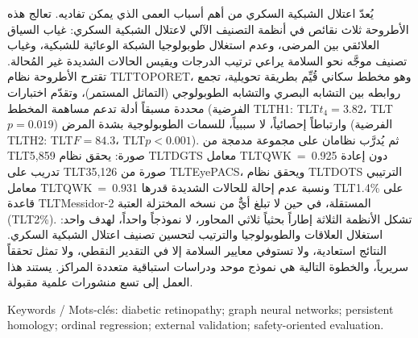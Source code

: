 \documentclass[11pt,a4paper]{article}
\newcommand{\en}[1]{\mbox{\textdir TLT\relax\foreignlanguage{english}{#1}}}
\newcommand{\sect}[1]{\par\vspace{5pt}{\color{navy}\bfseries\large #1}\par\vspace{1pt}{\color{navy}\hrule height 0.6pt}\vspace{4pt}}
\begin{document}
\sect{\foreignlanguage{arabic}{ملخص}}
\begin{otherlanguage}{arabic}
يُعدّ اعتلال الشبكية السكري من أهم أسباب العمى الذي يمكن تفاديه. تعالج هذه الأطروحة ثلاث
نقائص في أنظمة التصنيف الآلي لاعتلال الشبكية السكري: غياب السياق العلائقي بين المرضى، وعدم
استغلال طوبولوجيا الشبكة الوعائية للشبكية، وغياب تصنيف موجَّه نحو السلامة يراعي ترتيب الدرجات
ويقيس الحالات الشديدة غير المُحالة. تقترح الأطروحة نظام
\en{TOPORET}،
وهو مخطط سكاني قُيِّم بطريقة تحويلية، تجمع روابطه بين التشابه البصري والتشابه الطوبولوجي (التماثل المستمر)،
وتقدّم اختبارات محددة مسبقاً أدلة تدعم مساهمة المخطط
(الفرضية \en{H1}: \en{$t_4=3.82$}، \en{$p=0.019$})
وارتباطاً إحصائياً، لا سببياً، للسمات الطوبولوجية بشدة المرض
(الفرضية \en{H2}: \en{$F=84.3$}، \en{$p<0.001$}).
ثم يُدرَّب نظامان على مجموعة مدمجة من
\en{5,859}
صورة: يحقق نظام
\en{DGTS}
معامل
\en{QWK = 0.925}
دون إعادة تدريب على
\en{35,126}
صورة من
\en{EyePACS}،
ويحقق نظام
\en{DOTS}
الترتيبي معامل
\en{QWK = 0.931}
ونسبة عدم إحالة للحالات الشديدة قدرها
\en{1.4\%}
على قاعدة
\en{Messidor-2}
المستقلة، في حين لا تبلغ أيٌّ من نسخه المختزلة العتبة
(\en{2\%}).
تشكل الأنظمة الثلاثة إطاراً بحثياً ثلاثي المحاور، لا نموذجاً واحداً، لهدف واحد: استغلال العلاقات والطوبولوجيا والترتيب لتحسين تصنيف اعتلال الشبكية السكري.
النتائج استعادية، ولا تستوفي معايير السلامة إلا في التقدير النقطي، ولا تمثل تحققاً سريرياً، والخطوة التالية هي نموذج موحد ودراسات استباقية متعددة
المراكز. يستند هذا العمل إلى تسع منشورات علمية مقبولة.
\end{otherlanguage}

\vfill
{\footnotesize\color{gray}\centering Keywords / Mots-clés: diabetic retinopathy; graph neural networks; persistent homology;
ordinal regression; external validation; safety-oriented evaluation.\par}
\end{document}
